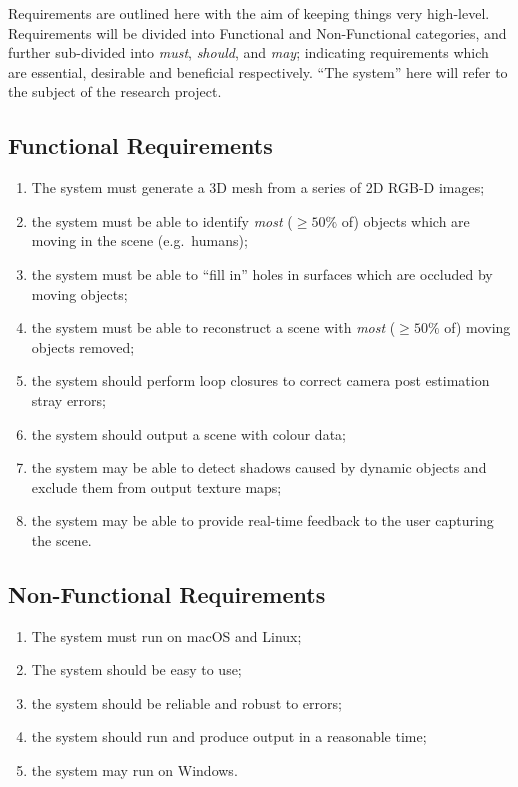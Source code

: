 Requirements are outlined here with the aim of keeping things very high-level.
Requirements will be divided into Functional and Non-Functional categories, and further sub-divided into \emph{must}, \emph{should},
and \emph{may}; indicating requirements which are essential, desirable and beneficial respectively.
``The system'' here will refer to the subject of the research project.

\subsection{Functional Requirements}\label{subsec:functional-requirements}
\begin{enumerate}
	\item The system must generate a 3D mesh from a series of 2D RGB-D images;
	\item the system must be able to identify \emph{most} ($\ge 50\%$ of) objects which are moving in the scene (e.g.\ humans);
	\item the system must be able to ``fill in'' holes in surfaces which are occluded by moving objects;
	\item the system must be able to reconstruct a scene with \emph{most} ($\ge 50\%$ of) moving objects removed;
	\item the system should perform loop closures to correct camera post estimation stray errors;
	\item the system should output a scene with colour data;
	\item the system may be able to detect shadows caused by dynamic objects and exclude them from output texture maps;
	\item the system may be able to provide real-time feedback to the user capturing the scene.
\end{enumerate}

\subsection{Non-Functional Requirements}\label{subsec:non-functional-requirements}
\begin{enumerate}
	\item The system must run on macOS and Linux;
	\item The system should be easy to use;
	\item the system should be reliable and robust to errors;
	\item the system should run and produce output in a reasonable time;
	\item the system may run on Windows.
\end{enumerate}
